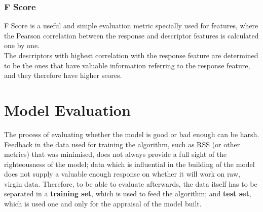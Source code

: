 \subsubsection{F Score}
F Score is a useful and simple evaluation metric specially used for features, where the Pearson correlation between the response and descriptor features is calculated one by one.\\

The descriptors with highest correlation with the response feature are determined to be the ones that have valuable information referring to the response feature, and they therefore have higher scores. 


\section{Model Evaluation}
The process of evaluating whether the model is good or bad enough can be harsh. Feedback in the data used for training the algorithm, such as RSS (or other metrics) that was minimised, does not always provide a full sight of the righteousness of the model; data which is influential in the building of the model does not supply a valuable enough response on whether it will work on raw, virgin data. Therefore, to be able to evaluate afterwards, the data itself has to be separated in a \textbf{training set}, which is used to feed the algorithm; and \textbf{test set}, which is used one and only for the appraisal of the model built. 
